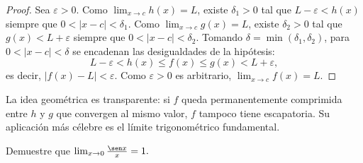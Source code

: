 \begin{proof}
Sea $\varepsilon>0$. Como $\lim_{x\to c}h(x)=L$, existe $\delta_1>0$ tal que
$L-\varepsilon<h(x)$ siempre que $0<|x-c|<\delta_1$. Como
$\lim_{x\to c}g(x)=L$, existe $\delta_2>0$ tal que $g(x)<L+\varepsilon$ siempre
que $0<|x-c|<\delta_2$. Tomando $\delta=\min(\delta_1,\delta_2)$, para
$0<|x-c|<\delta$ se encadenan las desigualdades de la hipótesis:
\[
  L-\varepsilon<h(x)\leq f(x)\leq g(x)<L+\varepsilon,
\]
es decir, $|f(x)-L|<\varepsilon$. Como $\varepsilon>0$ es arbitrario,
$\lim_{x\to c}f(x)=L$.
\end{proof}

La idea geométrica es transparente: si $f$ queda permanentemente comprimida
entre $h$ y $g$ que convergen al mismo valor, $f$ tampoco tiene escapatoria.
Su aplicación más célebre es el límite trigonométrico fundamental.

\begin{theorem} Demuestre que \(
  \lim_{x \to 0} \frac{\sen x}{x} = 1.
\)
\end{theorem}

